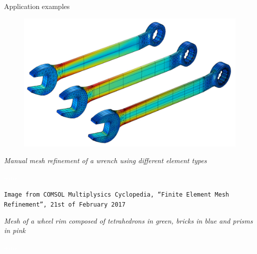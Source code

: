 \begin{frame}{Application examples}
   \begin{minipage}{0.5\textwidth}
      \begin{figure}[H]
         \raggedright
         \includegraphics[width=\textwidth]{Immagini/mesh-application-1.jpeg}
      \end{figure}
   \end{minipage}
   \hfill
   \begin{minipage}{0.45\textwidth}
      \footnotesize{\textit{Manual mesh refinement of a wrench using different element types}}

      \textcolor{white}{some}

      \tiny{\texttt{Image from COMSOL Multiplysics Cyclopedia, ``Finite Element Mesh Refinement'', 21st of February 2017}}
   \end{minipage}

   \vfill

   \begin{minipage}{0.425\textwidth}
      \footnotesize{\textit{Mesh of a wheel rim composed of tetrahedrons in green, bricks in blue and prisms in pink}}

      \textcolor{white}{some}


\end{minipage}
\end{frame}
